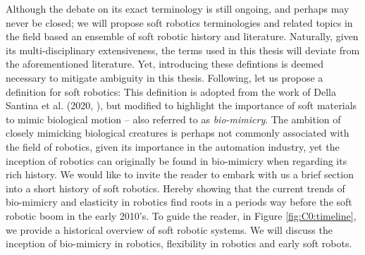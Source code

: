 Although the debate on its exact terminology is still ongoing, and perhaps may never be closed; we will propose  soft robotics terminologies and related topics in the field based an ensemble of soft robotic history and literature. Naturally, given its multi-disciplinary extensiveness, the terms used in this thesis will deviate from the aforementioned literature. Yet, introducing these defintions is deemed necessary to mitigate ambiguity in this thesis. Following, let us propose a definition for soft robotics:
%
%
This definition is adopted from the work of Della Santina et al. (2020, \cite{DellaSantina2020Springer}), but modified to highlight the importance of soft materials to mimic biological motion -- also referred to as \emph{bio-mimicry}. The ambition of closely mimicking biological creatures is perhaps not commonly associated with the field of robotics, given its importance in the automation industry, yet the inception of robotics can originally be found in bio-mimicry when regarding its rich history. We would like to invite the reader to embark with us a brief section into a short history of soft robotics. Hereby showing that the current trends of bio-mimicry and elasticity in robotics find roots in a periods way before the soft robotic boom in the early 2010's. To guide the reader, in Figure \ref{fig:C0:timeline}, we provide a historical overview of soft robotic systems. We will discuss the inception of bio-mimicry in robotics, flexibility in robotics and early soft robots.
\vspace{0.085em}
%
